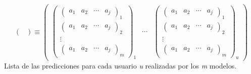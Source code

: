\begin{center}
\[\begin{pmatrix}
        \end{pmatrix}
        \equiv
        \begin{pmatrix}
            \begin{pmatrix}
                \begin{pmatrix} a_{1}  &  a_{2}  &  \cdots   & a_{j} \end{pmatrix}_{1} \\ 
                \begin{pmatrix} a_{1}  &  a_{2}  &  \cdots   & a_{j} \end{pmatrix}_{2} \\ 
                \vdots \\ 
                \begin{pmatrix} a_{1}  &  a_{2}  &  \cdots   & a_{j} \end{pmatrix}_{m}
            \end{pmatrix}_{\textit{1}}
            & 
            \cdots 
            &
            \begin{pmatrix}
                \begin{pmatrix} a_{1}  &  a_{2}  &  \cdots   & a_{j} \end{pmatrix}_{1} \\ 
                \begin{pmatrix} a_{1}  &  a_{2}  &  \cdots   & a_{j} \end{pmatrix}_{2} \\ 
                \vdots \\ 
                \begin{pmatrix} a_{1}  &  a_{2}  &  \cdots   & a_{j} \end{pmatrix}_{m}
            \end{pmatrix}_{\textit{u}}
        \end{pmatrix}
    \] 
    Lista de las predicciones para cada usuario \textit{u} realizadas por los \textit{m} modelos.
    \\
\end{center}

